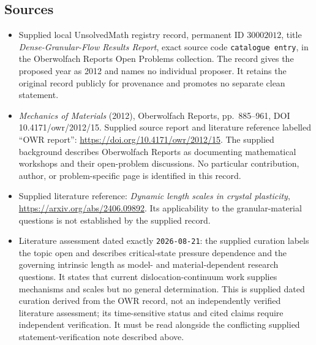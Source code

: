 \documentclass[11pt]{article}
\begin{document}
\subsection{Sources}
\begin{itemize}
\item Supplied local UnsolvedMath registry record, permanent ID \(30002012\), title \emph{Dense-Granular-Flow Results Report}, exact source code \texttt{catalogue entry}, in the Oberwolfach Reports Open Problems collection. The record gives the proposed year as 2012 and names no individual proposer. It retains the original record publicly for provenance and promotes no separate clean statement.
\item \emph{Mechanics of Materials} (2012), Oberwolfach Reports, pp.~885--961, DOI 10.4171/owr/2012/15. Supplied source report and literature reference labelled ``OWR report'': \url{https://doi.org/10.4171/owr/2012/15}. The supplied background describes Oberwolfach Reports as documenting mathematical workshops and their open-problem discussions. No particular contribution, author, or problem-specific page is identified in this record.
\item Supplied literature reference: \emph{Dynamic length scales in crystal plasticity}, \url{https://arxiv.org/abs/2406.09892}. Its applicability to the granular-material questions is not established by the supplied record.
\item Literature assessment dated exactly \texttt{2026-08-21}: the supplied curation labels the topic open and describes critical-state pressure dependence and the governing intrinsic length as model- and material-dependent research questions. It states that current dislocation-continuum work supplies mechanisms and scales but no general determination. This is supplied dated curation derived from the OWR record, not an independently verified literature assessment; its time-sensitive status and cited claims require independent verification. It must be read alongside the conflicting supplied statement-verification note described above.
\end{itemize}
\end{document}
